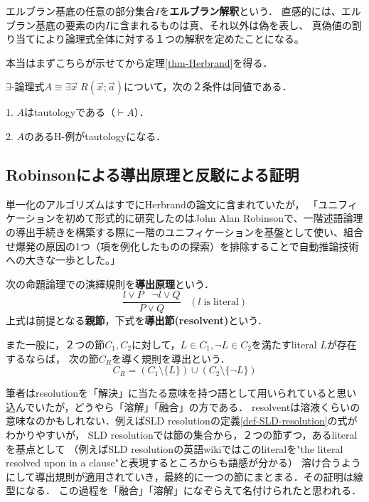 \documentclass[uplatex, 12pt, dvipdfmx]{jsreport}
\begin{document}
\begin{definition}
    エルブラン基底の任意の部分集合$I$を\textbf{エルブラン解釈}という．
    直感的には、エルブラン基底の要素の内$I$に含まれるものは真、それ以外は偽を表し、
    真偽値の割り当てにより論理式全体に対する１つの解釈を定めたことになる。
\end{definition}

本当はまずこちらが示せてから定理\ref{thm-Herbrand}を得る．
\begin{theorem}
    $\exists$-論理式$A\equiv\exists\vec{x}\;R(\vec{x};\vec{a})$について，次の２条件は同値である．

    1. $A$はtautologyである（$\vdash A$）．

    2. $A$のあるH-例がtautologyになる．
\end{theorem}

\subsection{Robinsonによる導出原理と反駁による証明}\label{subsection-Robinson}

単一化のアルゴリズムはすでにHerbrandの論文に含まれていたが，
「ユニフィケーションを初めて形式的に研究したのはJohn Alan Robinsonで、一階述語論理の導出手続きを構築する際に一階のユニフィケーションを基盤として使い、組合せ爆発の原因の1つ（項を例化したものの探索）を排除することで自動推論技術への大きな一歩とした。」


\begin{definition}[導出：命題論理]
    次の命題論理での演繹規則を\textbf{導出原理}という．
    \[ \frac{l\lor P\;\;\;\lnot l\lor Q}{P\lor Q}\;\;\;(l\mathrm{\;is\;literal}) \]
    上式は前提となる\textbf{親節}，下式を\textbf{導出節(resolvent)}という．

    また一般に，２つの節$C_1,C_2$に対して，$L\in C_1,\lnot L\in C_2$を満たすliteral $L$が存在するならば，
    次の節$C_R$を導く規則を導出という．
    \[ C_R = (C_1\setminus\{L\})\cup(C_2\setminus\{\lnot L\}) \]
\end{definition}
\begin{remark}
    筆者はresolutionを「解決」に当たる意味を持つ語として用いられていると思い込んでいたが，どうやら「溶解」「融合」の方である．
    resolventは溶液くらいの意味なのかもしれない．例えばSLD resolutionの定義\ref{def-SLD-resolution}の式がわかりやすいが，
    SLD resolutionでは節の集合から，２つの節ずつ，あるliteralを基点として
    （例えばSLD resolutionの英語wikiではこのliteralを"the literal resolved upon in a clause"と表現するところからも語感が分かる）
    溶け合うようにして導出規則が適用されていき，最終的に一つの節にまとまる．その証明は線型になる．
    この過程を「融合」「溶解」になぞらえて名付けられたと思われる．
\end{remark}
\end{document}
